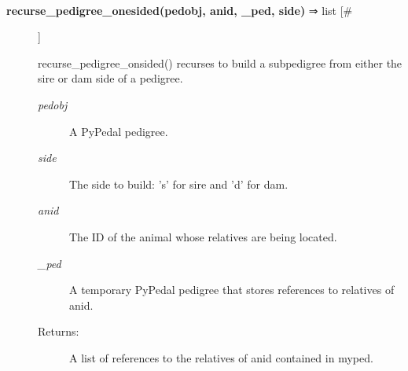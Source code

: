 \begin{description}
\begin{description}
\end{description}
\\ 

\item[\textbf{recurse\_pedigree\_onesided(pedobj, anid, \_ped, side)}
 ⇒ list [\#]]

 recurse\_pedigree\_onsided() recurses to build a subpedigree from either the sire or dam side of a pedigree.
\begin{description}
\item[\emph{pedobj}
] A PyPedal pedigree.
\item[\emph{side}
] The side to build: 's' for sire and 'd' for dam.
\item[\emph{anid}
] The ID of the animal whose relatives are being located.
\item[\emph{\_ped}
] A temporary PyPedal pedigree that stores references to relatives of anid.
\item[Returns:] A list of references to the relatives of anid contained in myped.

\end{description}
\\ 


\end{description}

